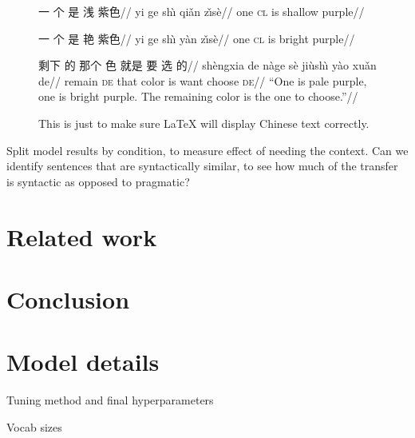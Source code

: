 \documentclass[11pt,a4paper]{article}
\newenvironment{zh}{\begin{CJK}{UTF8}{gbsn}}{\end{CJK}}
\begin{document}
\begin{figure}

\begin{zh}
\exdisplay
\begingl
\gla 一 个 是 浅 紫色//
\glb yi ge sh\`{\i} qi\v{a}n z\v{\i}s\`{e}//
\glc one \textsc{cl} is shallow purple//
\endgl

\begingl
\gla 一 个 是 艳 紫色//
\glb yi ge sh\`{\i} y\`{a}n z\v{\i}s\`{e}//
\glc one \textsc{cl} is bright purple//
\endgl

\begingl
\gla 剩下 的 那个 色 就是 要 选 的//
\glb sh\`engxia de n\`age s\`e ji\`ush\`{\i} y\`{a}o xu\v{a}n de//
\glc remain \textsc{de} that color is want choose \textsc{de}//
\glft ``One is pale purple, one is bright purple. The remaining color is the one to choose.''//
\endgl
\xe
\caption{This is just to make sure \LaTeX{} will display Chinese text correctly.}
\end{zh}
\end{figure}

Split model results by condition, to measure effect of needing the context. Can we identify sentences that are syntactically similar, to see how much of the transfer is syntactic as opposed to pragmatic?

\section{Related work}

\citet{Collobert2008}

\citet{Johnson2016}

\citet{Wu2016}

\citet{Kaiser2017}

\section{Conclusion}

\begin{comment}
\section*{Acknowledgments}

The acknowledgments should go immediately before the references.  Do
not number the acknowledgments section. Do not include this section
when submitting your paper for review.
\end{comment}




\appendix

\section{Model details}

Tuning method and final hyperparameters

Vocab sizes
\end{document}
